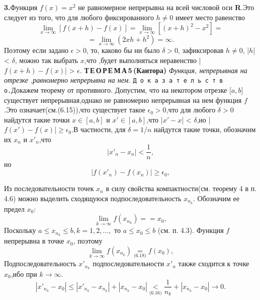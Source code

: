\documentclass[a4paper,12pt]{article}
\begin{document}
    \setcounter{page}{229}
    \newpage
    \textbf{3.}Функция $f(x) = x^2$ не равномерное непрерывна на всей числовой оси \textbf{R}.Это следует из того, что для любого фиксированного $h \ne 0$ имеет место равенство
    $$ \lim_{x\to\infty} [f(x + h) - f(x)] = \lim_{x\to\infty} [(x + h)^2 - x^2] = $$
    $$ = \lim_{x\to\infty} (2xh + h^2) = \infty.$$
    \noindent Поэтому если задано $\epsilon > 0$, то, каково бы ни было $\delta > 0$, зафиксировав $h \ne 0 ,\, $|$h$| < $\delta$, можно так выбрать $x$,что ,будет выполняться неравенство |$f(x+h) - f(x)$| > $\epsilon.$\newline
    \textbf{Т\,Е\,О\,Р\,Е\,М\,А\,5\,(Кантора)} \textsl{Функция, непрерывная на отрезке ,равномерно непрерывна на нем.}
    \newline
    \texttt{Д\,о\,к\,а\,з\,а\,т\,е\,л\,ь\,с\,т\,в\,о.}Докажем теорему от противного. Допустим, что на некотором отрезке [$a,b$] существует непрерывная,однако не равномерно непрерывная на нем функция $f$.Это означает(см.(6.15)),что существует такое $\epsilon_0 > 0$,что для любого $\delta > 0$ найдутся такие точки $x \in [a,b]$ и $x' \in [a,b]$,что |$x' - x$| < $\delta$,но |$f(x') - f(x)$|$\ge \epsilon_0$.В частности, для $\delta = 1/n$ найдутся такие точки, обозначим их $x_n$ и $x'_n$,что
    \begin{equation}
        |x'_n - x_n| < \frac{1}{n},\tag{6.16}
    \end{equation}
    но
    \begin{equation}
        |f(x'_n) - f(x_n)|\ge \epsilon_0 ,\tag{6.17}
    \end{equation}
    \par Из последовательности точек ${x_n}$ в силу свойства компактности(см. теорему 4 в п. 4.6) можно выделить сходящуюся подпоследовательность $ x_{n_k}$. Обозначим ее предел $x_0$:
    \begin{equation}
       \lim_{k\to\infty} f(x_{n_k}) = = x_0 ,\tag{6.18}
    \end{equation}
    \noindent Поскольку $a \le x_{n_k} \le b, k = 1,2, ... ,$ то $a \le x_0 \le b$ (см. п. 4.3).
    \newline
    Функция $f$ непрерывна в точке $x_0$, поэтому
    \begin{equation}
       \lim_{k\to\infty} f(x_{n_k}) \underset{\text{(6.18)}}{=} f(x_0) ,\tag{6.19}
    \end{equation}
    \newline
    Подпоследовательность ${x'_{n_k}}$ подпоследовательности ${x'_n}$ также сходится к точке $x_0$,ибо при $k \rightarrow \infty$.
    $$|x'_{n_k} - x_0| \le |x'_{n_k} - x_{n_k}| + |x_{n_k} - x_0| \underset{\text{(6.16)}}{<} \frac{1}{n_k} + |x_{n_k} - x_0| \rightarrow 0.$$
\end{document}

